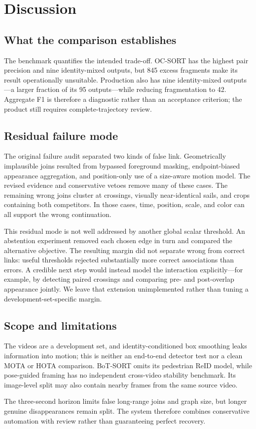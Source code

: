 \section{Discussion}
\label{sec:discussion}

\subsection{What the comparison establishes}

The benchmark quantifies the intended trade-off.  OC-SORT has the highest pair
precision and nine identity-mixed outputs, but 845 excess fragments make its result
operationally unsuitable.  Production also has nine identity-mixed outputs---a larger
fraction of its 95 outputs---while reducing fragmentation to 42.  Aggregate F1 is
therefore a diagnostic rather than an acceptance criterion; the product still
requires complete-trajectory review.

\subsection{Residual failure mode}

The original failure audit separated two kinds of false link.  Geometrically
implausible joins resulted from bypassed foreground masking, endpoint-biased
appearance aggregation, and position-only use of a size-aware motion model.  The
revised evidence and conservative vetoes remove many of these cases.  The remaining
wrong joins cluster at crossings, visually near-identical sails, and crops containing
both competitors.  In those cases, time, position, scale, and color can all support
the wrong continuation.

This residual mode is not well addressed by another global scalar threshold.  An
abstention experiment removed each chosen edge in turn and compared the alternative
objective.  The resulting margin did not separate wrong from correct links: useful
thresholds rejected substantially more correct associations than errors.  A credible
next step would instead model the interaction explicitly---for example, by detecting
paired crossings and comparing pre- and post-overlap appearance jointly.  We leave
that extension unimplemented rather than tuning a development-set-specific margin.

\subsection{Scope and limitations}

The videos are a development set, and identity-conditioned box smoothing leaks
information into motion; this is neither an end-to-end detector test nor a clean MOTA
or HOTA comparison.  BoT-SORT omits its pedestrian ReID model, while pose-guided
framing has no independent cross-video stability benchmark.  Its image-level split
may also contain nearby frames from the same source video.

The three-second horizon limits false long-range joins and graph size, but longer
genuine disappearances remain split.  The system therefore combines conservative
automation with review rather than guaranteeing perfect recovery.
